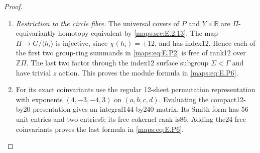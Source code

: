 \begin{proof}
\begin{enumerate}[label={$\langle1\rangle$\arabic*.},leftmargin=*]
\item \emph{Restriction to the circle fibre.}
The universal covers of $P$ and $Y\times\mathbb R$
are $\Pi$-equivariantly homotopy equivalent by
\ref{maps:src:E.2.13}. The map $\Pi\to G/\langle h_i\rangle$
is injective, since $\chi(h_i)=\pm12$, and has
index12. Hence each of the first two group-ring
summands in \eqref{maps:eq:E.P2} is free of rank12 over
$\mathbb Z\Pi$. The last two factor through the
index12 surface subgroup $\Sigma<\Gamma$ and
have trivial $z$ action. This proves the module
formula in \eqref{maps:eq:E.P6}.

\item For its exact coinvariants use the regular
12-sheet permutation representation with
exponents $(4,-3,-4,3)$ on $(a,b,c,d)$.
Evaluating the compact12-by20 presentation gives
an integral144-by240 matrix. Its Smith form has
56 unit entries and two entries6; its free
cokernel rank is86. Adding the24 free
coinvariants proves the last formula in \eqref{maps:eq:E.P6}.

\end{enumerate}
\end{proof}


